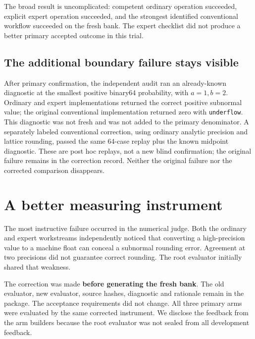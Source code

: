 \documentclass[
  10pt,
]{article}
\newcommand{\editionbreak}{\par\bigskip\Needspace{8\baselineskip}}
\begin{document}
The broad result is uncomplicated: competent ordinary operation
succeeded, explicit expert operation succeeded, and the strongest
identified conventional workflow succeeded on the fresh bank. The expert
checklist did not produce a better primary accepted outcome in this
trial.

\hypertarget{the-additional-boundary-failure-stays-visible}{%
\subsection{The additional boundary failure stays
visible}\label{the-additional-boundary-failure-stays-visible}}

After primary confirmation, the independent audit ran an already-known
diagnostic at the smallest positive binary64 probability, with
\(a=1,b=2\). Ordinary and expert implementations returned the correct
positive subnormal value; the original conventional implementation
returned zero with \texttt{underflow}. This diagnostic was not fresh and
was not added to the primary denominator. A separately labeled
conventional correction, using ordinary analytic precision and lattice
rounding, passed the same 64-case replay plus the known midpoint
diagnostic. These are post hoc replays, not a new blind confirmation;
the original failure remains in the correction record. Neither the
original failure nor the corrected comparison disappears.

\editionbreak

\hypertarget{a-better-measuring-instrument}{%
\section{A better measuring
instrument}\label{a-better-measuring-instrument}}

The most instructive failure occurred in the numerical judge. Both the
ordinary and expert workstreams independently noticed that converting a
high-precision value to a machine float can conceal a subnormal rounding
error. Agreement at two precisions did not guarantee correct rounding.
The root evaluator initially shared that weakness.

The correction was made \textbf{before generating the fresh bank}. The
old evaluator, new evaluator, source hashes, diagnostic and rationale
remain in the package. The acceptance requirements did not change. All
three primary arms were evaluated by the same corrected instrument. We
disclose the feedback from the arm builders because the root evaluator
was not sealed from all development feedback.
\end{document}
